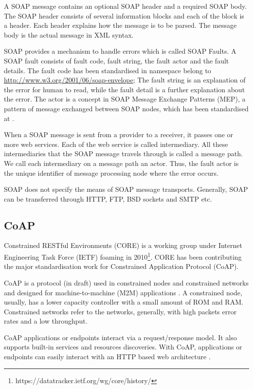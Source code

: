 A SOAP message contains an optional SOAP header and a required SOAP body. The SOAP header consists of several information blocks and each of the block is a header. Each header explains how the message is to be parsed. The message body is the actual message in XML syntax. 

SOAP provides a mechanism to handle errors which is called SOAP Faults. A SOAP fault consists of fault code, fault string, the fault actor and the fault details. The fault code has been standardised in namespace belong to \url{http://www.w3.org/2001/06/soap-envelope}; The fault string is an explanation of the error for human to read, while the fault detail is a further explanation about the error. The actor is a concept in SOAP Message Exchange Patterns (MEP), a pattern of message exchanged between SOAP nodes, which has been standardised at \cite{booth2007web}.

When a SOAP message is sent from a provider to a receiver, it passes one or more web services. Each of the web service is called intermediary. All these intermediaries that the SOAP message travels through is called a message path. We call each intermediary on a message path an actor. Thus, the fault actor is the unique identifier of message processing node where the error occurs. 

SOAP does not specify the means of SOAP message transports. Generally, SOAP can be transferred through HTTP, FTP, BSD sockets and SMTP etc. 

\subsection{CoAP}
Constrained RESTful Environments (CORE) is a working group under Internet Engineering Task Force (IETF) foaming in 2010\footnote{https://datatracker.ietf.org/wg/core/history/}. CORE has been contributing the major standardisation work for Constrained Application Protocol (CoAP). 

CoAP is a protocol (in draft) used in constrained nodes and constrained networks and designed for machine-to-machine (M2M) applications \cite{shelby2013constrained}. A constrained node, usually, has a lower capacity controller with a small amount of ROM and RAM. Constrained networks refer to the networks, generally, with high packets error rates and a low throughput.

CoAP applications or endpoints interact via a request/response model. It also supports built-in services and resources discoveries. With CoAP, applications or endpoints can easily interact with an HTTP based web architecture \cite{shelby2013constrained}.


